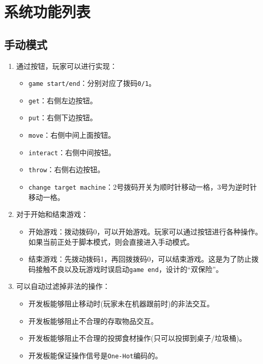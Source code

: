 \documentclass[12pt, a4paper]{ctexart}
\begin{document}
\section{系统功能列表}
\subsection{手动模式}
\begin{enumerate}
	\item 通过按钮，玩家可以进行实现：
        \begin{itemize}
            \item \texttt{game start/end}：分别对应了拨码\texttt{0/1}。
            \item \texttt{get}：右侧左边按钮。
            \item \texttt{put}：右侧下边按钮。
            \item \texttt{move}：右侧中间上面按钮。
            \item \texttt{interact}：右侧中间按钮。
            \item \texttt{throw}：右侧右边按钮。
            \item \texttt{change target machine}：2号拨码开关为顺时针移动一格，3号为逆时针移动一格。
        \end{itemize}
	\item 对于开始和结束游戏：
        \begin{itemize}
            \item 开始游戏：拨动拨码0，可以开始游戏。玩家可以通过按钮进行各种操作。如果当前正处于脚本模式，则会直接进入手动模式。
            \item 结束游戏：先拨动拨码1，再回拨拨码0，可以结束游戏。这是为了防止拨码接触不良以及玩游戏时误启动\texttt{game end}，设计的“双保险”。
        \end{itemize}
	\item 可以自动过滤掉非法的操作：
        \begin{itemize}
            \item 开发板能够阻止移动时(玩家未在机器跟前时)的非法交互。
            \item 开发板能够阻止不合理的存取物品交互。
            \item 开发板能够阻止不合理的投掷食材操作(只可以投掷到桌子/垃圾桶)。
            \item 开发板能保证操作信号是\texttt{One-Hot}编码的。
        \end{itemize}
\end{enumerate}
\end{document}
